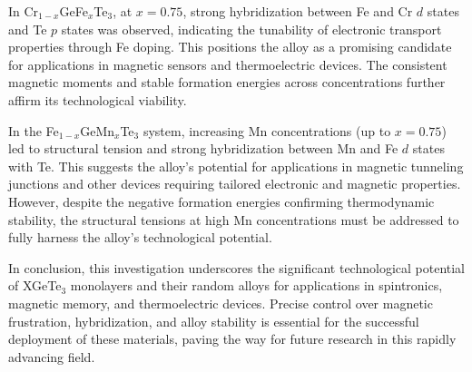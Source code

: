 In Cr$_{1-x}$GeFe$_{x}$Te$_3$, at $x = 0.75$, strong hybridization between Fe and Cr $d$ states and Te $p$ states was observed, indicating the tunability of electronic transport properties through Fe doping. This positions the alloy as a promising candidate for applications in magnetic sensors and thermoelectric devices. The consistent magnetic moments and stable formation energies across concentrations further affirm its technological viability.

In the Fe$_{1-x}$GeMn$_{x}$Te$_3$ system, increasing Mn concentrations (up to $x = 0.75$) led to structural tension and strong hybridization between Mn and Fe $d$ states with Te. This suggests the alloy’s potential for applications in magnetic tunneling junctions and other devices requiring tailored electronic and magnetic properties. However, despite the negative formation energies confirming thermodynamic stability, the structural tensions at high Mn concentrations must be addressed to fully harness the alloy's technological potential.

In conclusion, this investigation underscores the significant technological potential of XGeTe$_3$ monolayers and their random alloys for applications in spintronics, magnetic memory, and thermoelectric devices. Precise control over magnetic frustration, hybridization, and alloy stability is essential for the successful deployment of these materials, paving the way for future research in this rapidly advancing field.